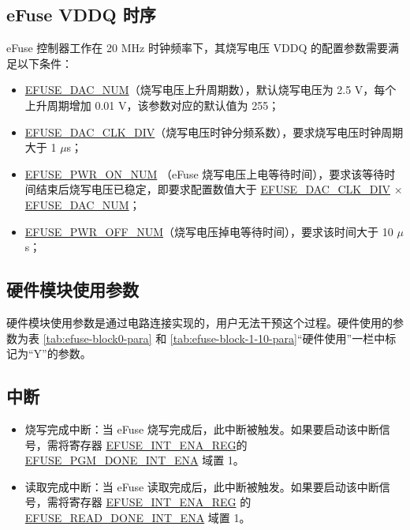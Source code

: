 \documentclass[main\_\_CN.tex]{subfiles}
\begin{document}
\subsection{eFuse VDDQ 时序}
\label{sec:efuse-vddq-timing}

eFuse 控制器工作在 20 MHz 时钟频率下，其烧写电压 VDDQ 的配置参数需要满足以下条件：
\begin{itemize}
    \item \hyperref[fielddesc:EFUSEDACNUM]{EFUSE\_DAC\_NUM}（烧写电压上升周期数），默认烧写电压为 2.5 V，每个上升周期增加 0.01 V，该参数对应的默认值为 255；
    \item \hyperref[fielddesc:EFUSEDACCLKDIV]{EFUSE\_DAC\_CLK\_DIV}（烧写电压时钟分频系数），要求烧写电压时钟周期大于 1 $\mu$s；
    \item \hyperref[fielddesc:EFUSEPWRONNUM]{EFUSE\_PWR\_ON\_NUM} （eFuse 烧写电压上电等待时间），要求该等待时间结束后烧写电压已稳定，即要求配置数值大于 \hyperref[fielddesc:EFUSEDACCLKDIV]{EFUSE\_DAC\_CLK\_DIV} × \hyperref[fielddesc:EFUSEDACNUM]{EFUSE\_DAC\_NUM}；
    \item \hyperref[fielddesc:EFUSEPWROFFNUM]{EFUSE\_PWR\_OFF\_NUM}（烧写电压掉电等待时间），要求该时间大于 10 $\mu$s；
\end{itemize}




\subsection{硬件模块使用参数}

硬件模块使用参数是通过电路连接实现的，用户无法干预这个过程。硬件使用的参数为表 \ref{tab:efuse-block0-para} 和 \ref{tab:efuse-block-1-10-para}“硬件使用”一栏中标记为“Y”的参数。

\subsection{中断}
\begin{itemize}
\item 烧写完成中断：当 eFuse 烧写完成后，此中断被触发。如果要启动该中断信号，需将寄存器 \hyperref[regdesc:EFUSEINTENAREG]{EFUSE\_INT\_ENA\_REG}的 \hyperref[fielddesc:EFUSEPGMDONEINTENA]{EFUSE\_PGM\_DONE\_INT\_ENA} 域置 1。
\item 读取完成中断：当 eFuse 读取完成后，此中断被触发。如果要启动该中断信号，需将寄存器 \hyperref[regdesc:EFUSEINTENAREG]{EFUSE\_INT\_ENA\_REG} 的 \hyperref[fielddesc:EFUSEREADDONEINTENA]{EFUSE\_READ\_DONE\_INT\_ENA} 域置 1。
\end{itemize}
\end{document}
